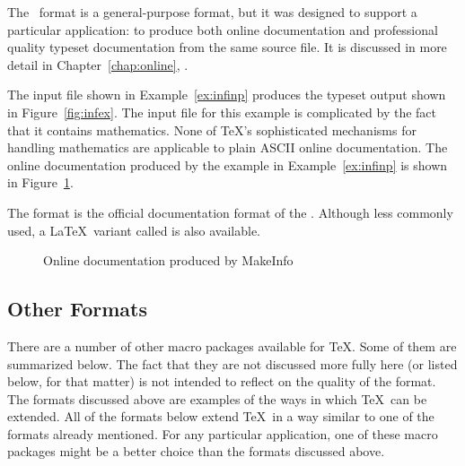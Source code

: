 The \TeXinfo\ format is a general-purpose format, but it was designed to
support a particular application: to produce both online documentation and
professional quality typeset documentation from the same source file.  It is
discussed in more detail in Chapter~\ref{chap:online},
{\it {}}.

The input file shown in Example~\ref{ex:infinp} produces the typeset output
shown in Figure~\ref{fig:infex}.  The input file for this example is
complicated by the fact that it contains mathematics.  None of \TeX's
sophisticated mechanisms for handling mathematics are applicable to plain
ASCII online documentation.  The online documentation produced by the
example in Example~\ref{ex:infinp} is shown in Figure~\ref{fig:infinf}.

The  format 
is the official documentation format of the .  Although less commonly used, a \LaTeX\ variant
called  is also available.



\begin{figure}
  \begin{center}
    \caption{Online documentation produced by MakeInfo}
    \label{fig:infinf}
  \end{center}
\end{figure}

\subsection{Other Formats}

There are a number of other macro packages available for \TeX.  Some of them
are summarized below.  The fact that they are not discussed more fully here
(or listed below, for that matter) is not intended to reflect on the quality
of the format.  The formats discussed above are examples of the ways in which
\TeX\ can be extended.  All of the formats below extend \TeX\ in a way similar
to one of the formats already mentioned.  For any particular application, one
of these macro packages might be a better choice than the formats discussed 
above.

